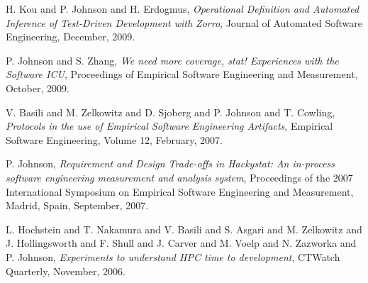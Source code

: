 \begin{Publications: Closely Related}

\item H. Kou and P. Johnson and H. Erdogmus, {\em Operational Definition and 
Automated Inference of Test-Driven Development with Zorro}, 
Journal of Automated Software Engineering, December, 2009.

\item P. Johnson and S. Zhang, {\em We need more coverage, stat!  Experiences with the Software ICU}, 
Proceedings of  Empirical Software Engineering and Measurement, October, 2009.
  
\item V. Basili and M. Zelkowitz and D. Sjoberg and P. Johnson and T. Cowling,
{\em Protocols in the use of Empirical Software Engineering Artifacts}, 
Empirical Software Engineering, Volume 12, February, 2007.

\item P. Johnson, {\em Requirement and Design Trade-offs in Hackystat: An
in-process software engineering measurement and analysis system},
Proceedings of the 2007 International Symposium on Empirical Software
Engineering and Measurement, Madrid, Spain, September, 2007.

\item L. Hochstein and T. Nakamura and V. Basili and S. Asgari and 
M. Zelkowitz and J. Hollingsworth and F. Shull and J. Carver and 
M. Voelp and N. Zazworka and P. Johnson, {\em Experiments to 
understand HPC time to development}, CTWatch Quarterly, 
November, 2006.

\end{Publications: Closely Related}


